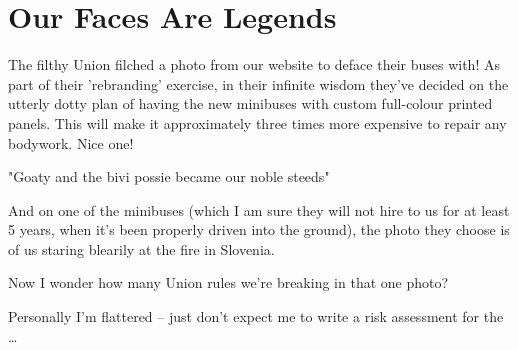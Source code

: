 \section{Our Faces Are Legends}

The filthy Union filched a photo from our website to deface their buses with! As part of their 'rebranding' exercise, in their infinite wisdom they've decided on the utterly dotty plan of having the new minibuses with
custom full-colour printed panels. This will make it approximately three times more expensive to repair any
bodywork. Nice one!

\begin{marginfigure}
      \checkoddpage \ifoddpage \forcerectofloat \else \forceversofloat \fi
      \centering
  \caption{"Goaty and the bivi possie became our noble steeds" }
\end{marginfigure}

And on one of the minibuses
(which I am sure they will not
hire to us for at least 5 years,
when it's been properly driven
into the ground), the photo
they choose is of us staring
blearily at the fire in Slovenia.

Now I wonder how many Union rules we're breaking in that one photo?

Personally I'm flattered – just
don't expect me to write a risk
assessment for the \ldots{}



